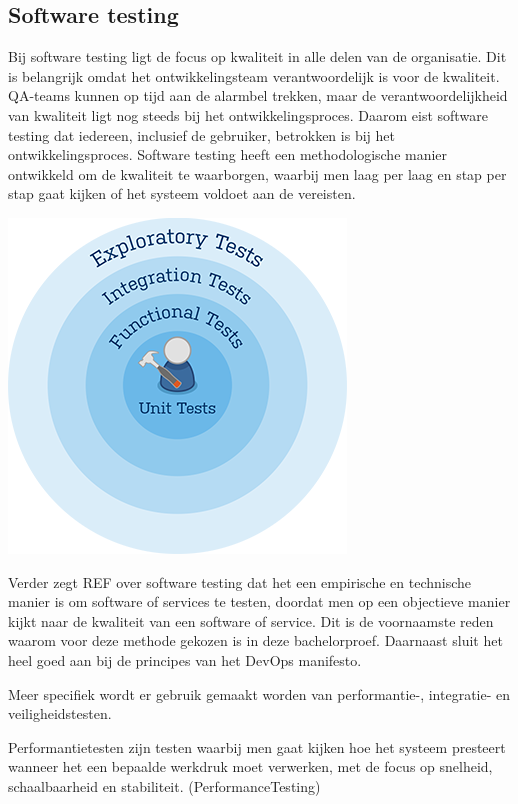 \subsection{Software testing}
\label{sec:testing-uitleg}
Bij software testing ligt de focus op kwaliteit in alle delen van de organisatie. Dit is belangrijk omdat het ontwikkelingsteam verantwoordelijk is voor de kwaliteit. QA-teams kunnen op tijd aan de alarmbel trekken, maar de verantwoordelijkheid van kwaliteit ligt nog steeds bij het ontwikkelingsproces. Daarom eist software testing dat iedereen, inclusief de gebruiker, betrokken is bij het ontwikkelingsproces. Software testing heeft een methodologische manier ontwikkeld om de kwaliteit te waarborgen, waarbij men laag per laag en stap per stap gaat kijken of het systeem voldoet aan de vereisten.

\begin{center}
	\includegraphics[scale=0.5]{img/testing.png}
\end{center}

Verder zegt REF over software testing dat het een empirische en technische manier is om software of services te testen, doordat men op een objectieve manier kijkt naar de kwaliteit van een software of service. Dit is de voornaamste reden waarom voor deze methode gekozen is in deze bachelorproef. Daarnaast sluit het heel goed aan bij de principes van het DevOps manifesto.

Meer specifiek wordt er gebruik gemaakt worden van performantie-, integratie- en veiligheidstesten.

Performantietesten zijn testen waarbij men gaat kijken hoe het systeem presteert wanneer het een bepaalde werkdruk moet verwerken, met de focus op snelheid, schaalbaarheid en stabiliteit. (PerformanceTesting)

